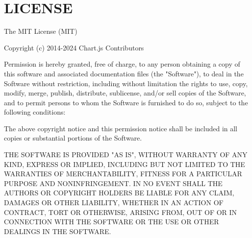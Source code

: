 \chapter{LICENSE}
\hypertarget{md_node__modules_2chart_8js_2_l_i_c_e_n_s_e}{}\label{md_node__modules_2chart_8js_2_l_i_c_e_n_s_e}
The MIT License (MIT)

Copyright (c) 2014-\/2024 Chart.\+js Contributors

Permission is hereby granted, free of charge, to any person obtaining a copy of this software and associated documentation files (the "{}\+Software"{}), to deal in the Software without restriction, including without limitation the rights to use, copy, modify, merge, publish, distribute, sublicense, and/or sell copies of the Software, and to permit persons to whom the Software is furnished to do so, subject to the following conditions\+:

The above copyright notice and this permission notice shall be included in all copies or substantial portions of the Software.

THE SOFTWARE IS PROVIDED "{}\+AS IS"{}, WITHOUT WARRANTY OF ANY KIND, EXPRESS OR IMPLIED, INCLUDING BUT NOT LIMITED TO THE WARRANTIES OF MERCHANTABILITY, FITNESS FOR A PARTICULAR PURPOSE AND NONINFRINGEMENT. IN NO EVENT SHALL THE AUTHORS OR COPYRIGHT HOLDERS BE LIABLE FOR ANY CLAIM, DAMAGES OR OTHER LIABILITY, WHETHER IN AN ACTION OF CONTRACT, TORT OR OTHERWISE, ARISING FROM, OUT OF OR IN CONNECTION WITH THE SOFTWARE OR THE USE OR OTHER DEALINGS IN THE SOFTWARE. 